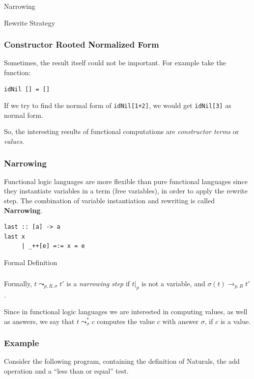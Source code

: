 \documentclass{beamer}
\begin{document}
\begin{section}{Narrowing}
\begin{subsection}{Rewrite Strategy}
\begin{frame}[fragile]

\frametitle{Constructor Rooted Normalized Form}
Sometimes, the result itself could not be important. For example take the function:

\begin{example}
\begin{verbatim}
idNil [] = []
\end{verbatim}
\end{example}
If we try to find the normal form of \verb|idNil[1+2]|, we would get \verb|idNil[3]| as normal form.

So, the interesting results of functional computations are \textit{constructor terms} or \textit{values}.
\end{frame}

\begin{frame}
[fragile]

\frametitle{Narrowing}

Functional logic languages are more flexible than pure functional languages since they instantiate variables in a term (free variables), in order to apply the rewrite step. The combination of variable instantiation and rewriting is called \textbf{Narrowing}.
\begin{example}
\begin{verbatim}
last :: [a] -> a
last x
     | _++[e] =:= x = e
\end{verbatim}
\end{example}
\end{frame}

\end{subsection}

\begin{subsection}{Formal Definition}
\begin{frame}
\frametitle{\subsecname}
  Formally, $t \leadsto _{p,R,\sigma} t'$ is a \textit{narrowing step} if $t|_p$ is not a variable, and $\sigma(t) \rightarrow_{p,R} t'$.


\Bigskip
 Since in functional logic languages we are interested in computing values, as well as answers, we say that $t \leadsto ^ * _ \sigma c$ computes the value $c$ with answer $\sigma$, if $c$ is a value.
  \end{frame}
\end{subsection}

  
\begin{frame}
[fragile]

\frametitle{Example}
  Consider the following program, containing the definition of Naturals, the add operation and a ``less than or equal'' test.


\end{frame}
\end{section}
\end{document}
